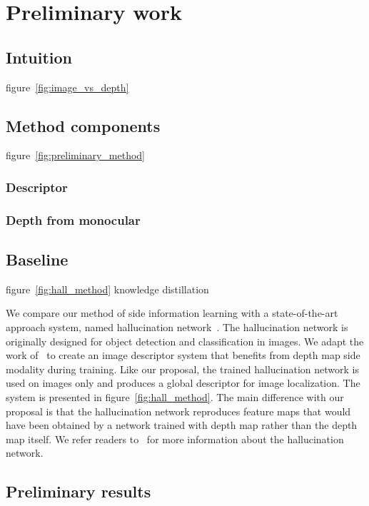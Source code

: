 \section{Preliminary work}
\label{sec:preliminary_work}

\subsection{Intuition}

figure~\ref{fig:image_vs_depth}


\subsection{Method components}

figure~\ref{fig:preliminary_method}

\subsubsection{Descriptor}


\subsubsection{Depth from monocular}



\subsection{Baseline}

figure~\ref{fig:hall_method}
knowledge distillation~\citep{hinton2015distilling}

We compare our method of side information learning with a state-of-the-art approach system, named hallucination network~\cite{Hoffman2016}. The hallucination network is originally designed for object detection and classification in images. We adapt the work of~\cite{Hoffman2016} to create an image descriptor system that benefits from depth map side modality during training. Like our proposal, the trained hallucination network is used on images only and produces a global descriptor for image localization. The system is presented in figure~\ref{fig:hall_method}. The main difference with our proposal is that the hallucination network reproduces feature maps that would have been obtained by a network trained with depth map rather than the depth map itself. We refer readers to~\cite{Hoffman2016} for more information about the hallucination network.

\subsection{Preliminary results}

